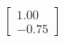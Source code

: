 \documentclass[preview]{standalone}
\begin{document}
\begin{align*}
\begin{bmatrix} 1.00 \\ -0.75 \end{bmatrix}
\end{align*}
\end{document}
